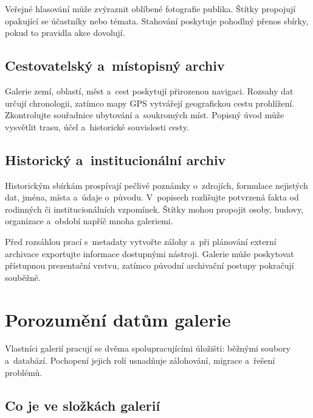 \documentclass[11pt,a4paper]{article}
\begin{document}
Veřejné hlasování může zvýraznit oblíbené fotografie publika. Štítky propojují
opakující se účastníky nebo témata. Stahování poskytuje pohodlný přenos sbírky,
pokud to pravidla akce dovolují.

\subsection{Cestovatelský a~místopisný archiv}

Galerie zemí, oblastí, měst a~cest poskytují přirozenou navigaci. Rozsahy dat
určují chronologii, zatímco mapy GPS vytvářejí geografickou cestu prohlížení.
Zkontrolujte souřadnice ubytování a~soukromých míst. Popisný úvod může vysvětlit
trasu, účel a~historické souvislosti cesty.

\subsection{Historický a~institucionální archiv}

Historickým sbírkám prospívají pečlivé poznámky o~zdrojích, formulace nejistých
dat, jména, místa a~údaje o~původu. V~popisech rozlišujte potvrzená fakta od
rodinných či institucionálních vzpomínek. Štítky mohou propojit osoby, budovy,
organizace a~období napříč mnoha galeriemi.

Před rozsáhlou prací s~metadaty vytvořte zálohy a~při plánování externí
archivace exportujte informace dostupnými nástroji. Galerie může poskytovat
přístupnou prezentační vrstvu, zatímco původní archivační postupy pokračují
souběžně.

\section{Porozumění datům galerie}
\label{sec:user-data}

Vlastníci galerií pracují se dvěma spolupracujícími úložišti: běžnými soubory
a~databází. Pochopení jejich rolí usnadňuje zálohování, migrace a~řešení
problémů.

\subsection{Co je ve složkách galerií}
\end{document}
